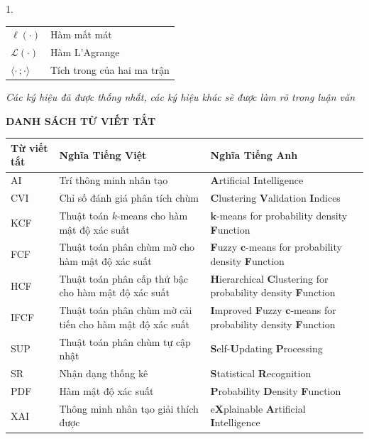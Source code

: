 \documentclass[a4paper,oneside]{book} %
\theoremstyle{plain}
\theoremstyle{plain}
\theoremstyle{nonumberplain}
\begin{document}
{\begin{spacing}{1.}
\begin{table}[h]
\begin{tabular*}{\columnwidth}{@{\extracolsep\fill}ll@{\extracolsep\fill}}
		$\ell(\cdot)$ & Hàm mất mát\\
		$\mathcal{L}(\cdot)$ & Hàm L'Agrange \\
		$\langle \cdot\,;\cdot\rangle$ & Tích trong của hai ma trận \\\bottomrule
	\end{tabular*}
	\begin{minipage}{\textwidth}
\fontsize{11pt}{14pt}\selectfont\it
		Các ký hiệu đã được thống nhất, các ký hiệu khác sẽ được làm rõ trong luận văn
	\end{minipage}
\end{table}


\newpage
\vspace*{50pt} %
\begin{center}
	{\fontsize{14}{0pt}\selectfont\bf DANH SÁCH TỪ VIẾT TẮT}
\end{center}
\vspace{20pt}  %



\begin{table}[H]
	\footnotesize
	\centering
	\begin{tabular*}{\columnwidth}{@{\extracolsep\fill}lp{6.5cm}p{6.5cm}@{\extracolsep\fill}} 
		\toprule
		\bf Từ viết tắt & \bf Nghĩa Tiếng Việt & \bf  Nghĩa Tiếng Anh \\ \midrule
		AI & Trí thông minh nhân tạo & \textbf{A}rtificial \textbf{I}ntelligence \\
		CVI & Chỉ số đánh giá phân tích chùm & \textbf{C}lustering \textbf{V}alidation \textbf{I}ndices \\
		KCF & Thuật toán $k$-means cho hàm mật độ xác suất & $\bm k$-means for probability density \textbf{F}unction \\
		FCF & Thuật toán phân chùm mờ cho hàm mật độ xác suất & \textbf{F}uzzy $\bm c$-means for probability density \textbf{F}unction \\
		HCF & Thuật toán phân cấp thứ bậc cho hàm mật độ xác suất & \textbf{H}ierarchical \textbf{C}lustering for probability density \textbf{F}unction \\
		IFCF & Thuật toán phân chùm mờ cải tiến cho hàm mật độ xác suất & \textbf{I}mproved \textbf{F}uzzy $\bm c$-means for probability density \textbf{F}unction \\
		SUP & Thuật toán phân chùm tự cập nhật & \textbf{S}elf-\textbf{U}pdating \textbf{P}rocessing \\
		SR & Nhận dạng thống kê & \textbf{S}tatistical \textbf{R}ecognition\\
		PDF & Hàm mật độ xác suất & \textbf{P}robability \textbf{D}ensity \textbf{F}unction\\
		XAI & Thông minh nhân tạo giải thích được & e\textbf{X}plainable \textbf{A}rtificial \textbf{I}ntelligence \\
		\bottomrule
	\end{tabular*}
\end{table}


\end{spacing}}
\end{document}
